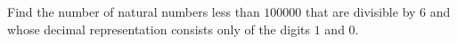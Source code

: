 Find the number of natural numbers less than $100000$ that are divisible by $6$ and whose decimal representation consists only of the digits $1$ and $0$.
